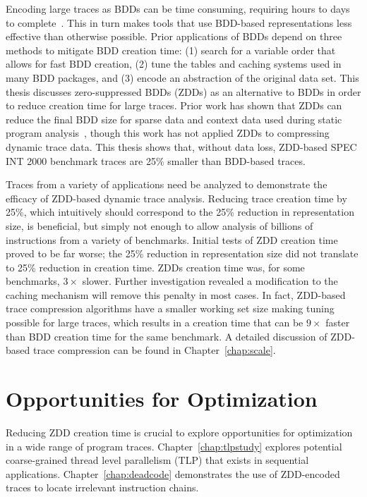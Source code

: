 \documentclass[defaultstyle,11pt]{thesis}
\begin{document}
Encoding large traces as BDDs can be time consuming, requiring hours
to days to complete~\cite{price:08:msthesis}.  This in turn makes
tools that use BDD-based representations less effective than otherwise
possible.  Prior applications of BDDs depend on three methods to
mitigate BDD creation time: (1) search for a variable order that
allows for fast BDD creation, (2) tune the tables and caching systems
used in many BDD packages, and (3) encode an abstraction of the
original data set.  This thesis discusses zero-suppressed BDDs (ZDDs)
as an alternative to BDDs in order to reduce creation time for large
traces.  Prior work has shown that ZDDs can reduce the final BDD size
for sparse data and context data used during static program
analysis~\cite{minato:01:STTT, lhotak:08:lcpc}, though this work has
not applied ZDDs to compressing dynamic trace data.  This thesis shows
that, without data loss, ZDD-based SPEC INT 2000 benchmark traces are
25\% smaller than BDD-based traces.

Traces from a variety of applications need be analyzed to demonstrate
the efficacy of ZDD-based dynamic trace analysis.  Reducing trace
creation time by 25\%, which intuitively should correspond to the 25\%
reduction in representation size, is beneficial, but simply not enough
to allow analysis of billions of instructions from a variety of
benchmarks.  Initial tests of ZDD creation time proved to be far
worse; the 25\% reduction in representation size did not translate to
25\% reduction in creation time.  ZDDs creation time was, for some
benchmarks, $3\times$ slower.  Further investigation revealed a
modification to the caching mechanism will remove this penalty in most
cases.  In fact, ZDD-based trace compression algorithms have a smaller
working set size making tuning possible for large traces, which
results in a creation time that can be $9\times$ faster than BDD
creation time for the same benchmark.  A detailed discussion of
ZDD-based trace compression can be found in Chapter~\ref{chap:scale}.

\section{Opportunities for Optimization}

Reducing ZDD creation time is crucial to explore opportunities for
optimization in a wide range of program
traces. Chapter~\ref{chap:tlpstudy} explores potential coarse-grained
thread level parallelism (TLP) that exists in sequential applications.
Chapter~\ref{chap:deadcode} demonstrates the use of ZDD-encoded traces
to locate irrelevant instruction chains.
\end{document}
